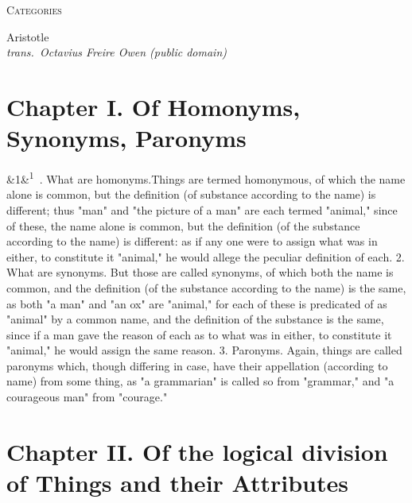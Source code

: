 \documentclass[12pt]{article}
\newcommand{\work}[1]{\begin{center}\LARGE\scshape #1\end{center}}
\newcommand{\attrib}[2]{\begin{center}\large #1\\[2pt]\small\itshape trans.\ #2\end{center}\vspace{1em}}
\newcommand{\para}[1][]{\par\noindent\ifx&#1&\else\textsuperscript{\footnotesize #1}~\fi}
\begin{document}
\work{Categories}

\attrib{Aristotle}{Octavius Freire Owen (public domain)}

\section*{Chapter I. Of Homonyms, Synonyms, Paronyms}

\para[1] 1. What are homonyms.Things are termed homonymous, of which the name alone is common, but the definition (of substance according to the name) is different; thus "man" and "the picture of a man" are each termed "animal," since of these, the name alone is common, but the definition (of the substance according to the name) is different: as if any one were to assign what was in either, to constitute it "animal," he would allege the peculiar definition of each. 2. What are synonyms. But those are called synonyms, of which both the name is common, and the definition (of the substance according to the name) is the same, as both "a man" and "an ox" are "animal," for each of these is predicated of as "animal" by a common name, and the definition of the substance is the same, since if a man gave the reason of each as to what was in either, to constitute it "animal," he would assign the same reason. 3. Paronyms. Again, things are called paronyms which, though differing in case, have their appellation (according to name) from some thing, as "a grammarian" is called so from "grammar," and "a courageous man" from "courage."

\section*{Chapter II. Of the logical division of Things and their Attributes}
\end{document}
